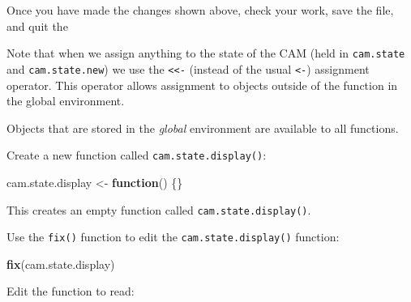\documentclass[12pt,a4paper]{book}
\newenvironment{Shaded}{\begin{snugshade}}{\end{snugshade}}
\newcommand{\KeywordTok}[1]{\textcolor[rgb]{0.13,0.29,0.53}{\textbf{#1}}}
\newcommand{\DataTypeTok}[1]{\textcolor[rgb]{0.13,0.29,0.53}{#1}}
\newcommand{\DecValTok}[1]{\textcolor[rgb]{0.00,0.00,0.81}{#1}}
\newcommand{\StringTok}[1]{\textcolor[rgb]{0.31,0.60,0.02}{#1}}
\newcommand{\OtherTok}[1]{\textcolor[rgb]{0.56,0.35,0.01}{#1}}
\newcommand{\ControlFlowTok}[1]{\textcolor[rgb]{0.13,0.29,0.53}{\textbf{#1}}}
\newcommand{\OperatorTok}[1]{\textcolor[rgb]{0.81,0.36,0.00}{\textbf{#1}}}
\newcommand{\NormalTok}[1]{#1}
\theoremstyle{definition}
\theoremstyle{definition}
\theoremstyle{definition}
\theoremstyle{remark}
\begin{document}
Once you have made the changes shown above, check your work, save the
file, and quit the

Note that when we assign anything to the state of the CAM (held in
\texttt{cam.state} and \texttt{cam.state.new}) we use the
\texttt{\textless{}\textless{}-} (instead of the usual
\texttt{\textless{}-}) assignment operator. This operator allows
assignment to objects outside of the function in the global environment.

Objects that are stored in the \emph{global} environment are available
to all functions.

Create a new function called \texttt{cam.state.display()}:

\begin{Shaded}
\begin{Highlighting}[]
\NormalTok{cam.state.display <-}\StringTok{ }\ControlFlowTok{function}\NormalTok{() \{\}}
\end{Highlighting}
\end{Shaded}

This creates an empty function called \texttt{cam.state.display()}.

Use the \texttt{fix()} function to edit the \texttt{cam.state.display()}
function:

\begin{Shaded}
\begin{Highlighting}[]
\KeywordTok{fix}\NormalTok{(cam.state.display)}
\end{Highlighting}
\end{Shaded}

Edit the function to read:

\begin{Shaded}
\end{Shaded}
\end{document}
